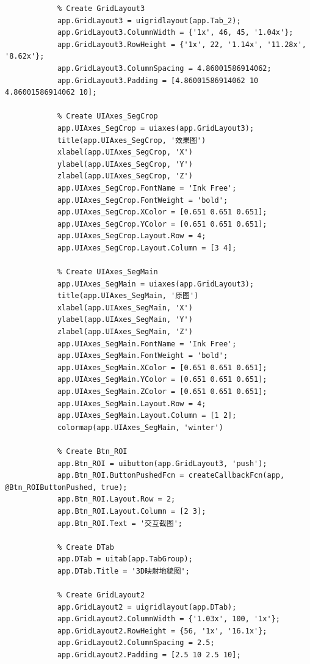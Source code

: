 \documentclass[UTF8, a4paper, 11pt]{ctexart}
\begin{document}
\begin{lstlisting}
            % Create GridLayout3
            app.GridLayout3 = uigridlayout(app.Tab_2);
            app.GridLayout3.ColumnWidth = {'1x', 46, 45, '1.04x'};
            app.GridLayout3.RowHeight = {'1x', 22, '1.14x', '11.28x', '8.62x'};
            app.GridLayout3.ColumnSpacing = 4.86001586914062;
            app.GridLayout3.Padding = [4.86001586914062 10 4.86001586914062 10];

            % Create UIAxes_SegCrop
            app.UIAxes_SegCrop = uiaxes(app.GridLayout3);
            title(app.UIAxes_SegCrop, '效果图')
            xlabel(app.UIAxes_SegCrop, 'X')
            ylabel(app.UIAxes_SegCrop, 'Y')
            zlabel(app.UIAxes_SegCrop, 'Z')
            app.UIAxes_SegCrop.FontName = 'Ink Free';
            app.UIAxes_SegCrop.FontWeight = 'bold';
            app.UIAxes_SegCrop.XColor = [0.651 0.651 0.651];
            app.UIAxes_SegCrop.YColor = [0.651 0.651 0.651];
            app.UIAxes_SegCrop.Layout.Row = 4;
            app.UIAxes_SegCrop.Layout.Column = [3 4];

            % Create UIAxes_SegMain
            app.UIAxes_SegMain = uiaxes(app.GridLayout3);
            title(app.UIAxes_SegMain, '原图')
            xlabel(app.UIAxes_SegMain, 'X')
            ylabel(app.UIAxes_SegMain, 'Y')
            zlabel(app.UIAxes_SegMain, 'Z')
            app.UIAxes_SegMain.FontName = 'Ink Free';
            app.UIAxes_SegMain.FontWeight = 'bold';
            app.UIAxes_SegMain.XColor = [0.651 0.651 0.651];
            app.UIAxes_SegMain.YColor = [0.651 0.651 0.651];
            app.UIAxes_SegMain.ZColor = [0.651 0.651 0.651];
            app.UIAxes_SegMain.Layout.Row = 4;
            app.UIAxes_SegMain.Layout.Column = [1 2];
            colormap(app.UIAxes_SegMain, 'winter')

            % Create Btn_ROI
            app.Btn_ROI = uibutton(app.GridLayout3, 'push');
            app.Btn_ROI.ButtonPushedFcn = createCallbackFcn(app, @Btn_ROIButtonPushed, true);
            app.Btn_ROI.Layout.Row = 2;
            app.Btn_ROI.Layout.Column = [2 3];
            app.Btn_ROI.Text = '交互截图';

            % Create DTab
            app.DTab = uitab(app.TabGroup);
            app.DTab.Title = '3D映射地貌图';

            % Create GridLayout2
            app.GridLayout2 = uigridlayout(app.DTab);
            app.GridLayout2.ColumnWidth = {'1.03x', 100, '1x'};
            app.GridLayout2.RowHeight = {56, '1x', '16.1x'};
            app.GridLayout2.ColumnSpacing = 2.5;
            app.GridLayout2.Padding = [2.5 10 2.5 10];


\end{lstlisting}
\end{document}

